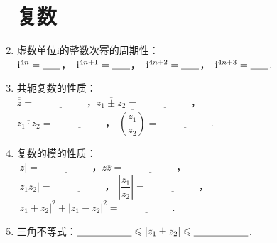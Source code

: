 \documentclass{article}
\newif\ifte
\renewcommand{\i}{\mathrm{i}}
\renewcommand\leq\leqslant
\begin{document}
\begin{multicols}{2}
\begin{enumerate}[leftmargin=20pt]
\section{复数}
\item 虚数单位$ \i $的整数次幂的周期性：\\
$ \i^{4n}=\underline{\ \ifte 1\else \hspace{0.4cm} \fi\ } $，\  
$ \i^{4n+1}=\underline{\ \ifte \i\else \hspace{0.4cm} \fi\ } $，\  
$ \i^{4n+2}=\underline{\ \ifte -1\else \hspace{0.4cm} \fi\ } $，\ 
$ \i^{4n+3}=\underline{\ \ifte -\i\else \hspace{0.4cm} \fi\ } $. 

\item 共轭复数的性质：\\ $ \overline{\overline{z}}=\underline{\ 
\ifte z\else \hspace{2cm} \fi\ }$，$ \overline{z_1\pm z_2}=
\underline{\ \ifte \overline{z_1}\pm \overline{z_2}
    \else \hspace{2cm} \fi\ } $，\\
$ \overline{z_1\cdot z_2}=\underline{\ \ifte 
 \overline{z_1}\cdot \overline{z_2} \else \hspace{2cm} \fi\ } $，
$ \overline{\left(\dfrac{z_1}{z_2}\right)}=\underline{\ \ifte 
\dfrac{\overline{z_1}}{\overline{z_2}} \else \hspace{2cm} \fi\ } $.  

\item 复数的模的性质：\\ $ |z|=\underline{\ \ifte |\overline{z}|
    \else \hspace{2cm} \fi\ } $，$ z\overline{z}=\underline{\ 
\ifte |z|^2=|\overline{z}|^2\else \hspace{2cm} \fi\ }$，\\
$ |z_1z_2|=\underline{\ \ifte |z_1||z_2|\else \hspace{2cm} \fi\ } $，
$ \left|\dfrac{z_1}{z_2}\right|=\underline{\ \ifte 
 \dfrac{|z_1|}{|z_2|}\else \hspace{2cm} \fi\ } $，\\
$ |z_1+z_2|^2+|z_1-z_2|^2=\underline{\ \ifte 
2\left( |z_1|^2+|z_2|^2 \right) \else \hspace{2cm} \fi\ }$. 

\item 三角不等式：$ \underline{\ \ifte ||z_1|-|z_2||
  \else \hspace{1.7cm} \fi\ }\leq |z_1\pm z_2| \leq 
\underline{\ \ifte |z_1|+|z_2|\else \hspace{1.7cm} \fi\ }$. 


\end{enumerate}
\end{multicols}
\end{document}
